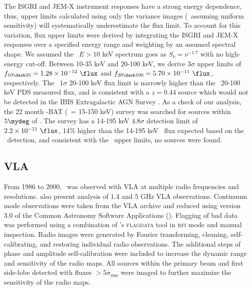 \documentclass[useAMS,usenatbib]{mn2e}
\begin{document}
The ISGRI and JEM-X instrument responses have a strong energy
dependence, thus, upper limits calculated using only the variance
images (\ie\ assuming uniform sensitivity) will systematically
underestimate the flux limit. To account for this variation, flux
upper limits were derived by integrating the ISGRI and JEM-X responses
over a specified energy range and weighting by an assumed spectral
shape. We assumed the \irs\ $E> 10$ keV spectrum goes as $S_{\nu} =
\nu^{-1.7}$ with no high-energy cut-off. Between 10-35 keV and 20-100
keV, we derive $3\sigma$ upper limits of $f_{10 \dash 35} = 1.28
\times 10^{-12} ~\flux$ and $f_{20 \dash 100} = 5.70 \times 10^{-11}
~\flux$, respectively. The \integral\ $1\sigma$ 20-100 keV flux limit
is narrowly higher than the \bepposax\ 20-100 keV PDS measured flux,
and is consistent with a $z = 0.44$ source which would not be detected
in the IBIS Extragalactic AGN Survey \citep{2006ApJ...636L..65B}. As a
check of our analysis, the 22 month \swift-BAT (\esens\ = 15-150 keV)
survey \citep{2010ApJS..186..378T} was searched for sources within
$5\mydeg$ of \irs. The survey has a 14-195 keV $4.8\sigma$ detection
limit of $2.2 \times 10^{-11} ~\flux$, 14\% higher than the 14-195 keV
\irs\ flux expected based on the \bepposax\ detection, and consistent
with the \integral\ upper limits, no sources were found.

\subsection{VLA}
\label{sec:vla}

From 1986 to 2000, \irs\ was observed with VLA at multiple radio
frequencies and resolutions. \citet[][hereafter
  H93]{1993ApJ...415...82H} also present analysis of 1.4 and 5 GHz VLA
observations. Continuum mode observations were taken from the VLA
archive and reduced using version 3.0 of the Common Astronomy Software
Applications (\casa). Flagging of bad data was performed using a
combination of \casa's {\textsc{flagdata}} tool in {\textsc{rfi}} mode
and manual inspection. Radio images were generated by Fourier
transforming, cleaning, self-calibrating, and restoring individual
radio observations. The additional steps of phase and amplitude
self-calibration were included to increase the dynamic range and
sensitivity of the radio maps. All sources within the primary beam and
first side-lobe detected with fluxes $> 5\sigma_{\mathrm{rms}}$ were
imaged to further maximize the sensitivity of the radio maps.
\end{document}
